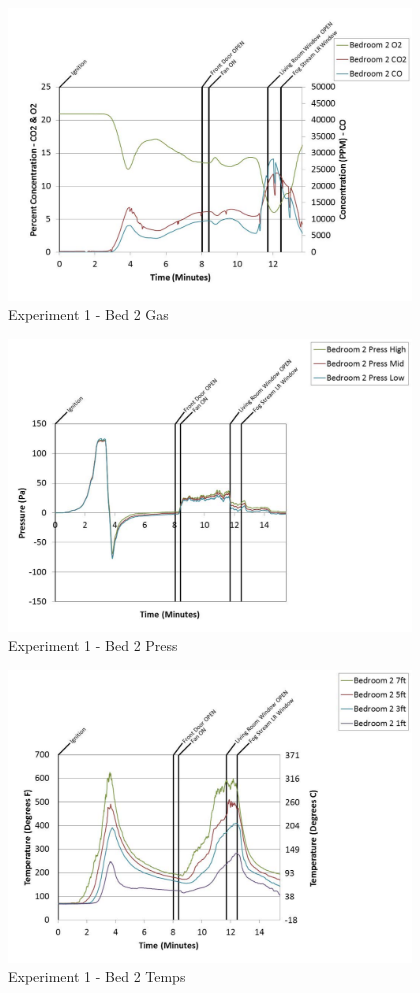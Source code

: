 \documentclass{article}
\begin{document}
\begin{appendices}
	\clearpage

	\begin{figure}[h!]
		\centering
		\includegraphics[height=3.05in]{0_Images/Results_Charts/Exp_1_Charts/Bed2Gas.pdf}
		\caption{Experiment 1 - Bed 2 Gas}
	\end{figure}
 

	\begin{figure}[h!]
		\centering
		\includegraphics[height=3.05in]{0_Images/Results_Charts/Exp_1_Charts/Bed2Press.pdf}
		\caption{Experiment 1 - Bed 2 Press}
	\end{figure}
 
	\clearpage

	\begin{figure}[h!]
		\centering
		\includegraphics[height=3.05in]{0_Images/Results_Charts/Exp_1_Charts/Bed2Temps.pdf}
		\caption{Experiment 1 - Bed 2 Temps}
	\end{figure}
 


\end{appendices}
\end{document}
